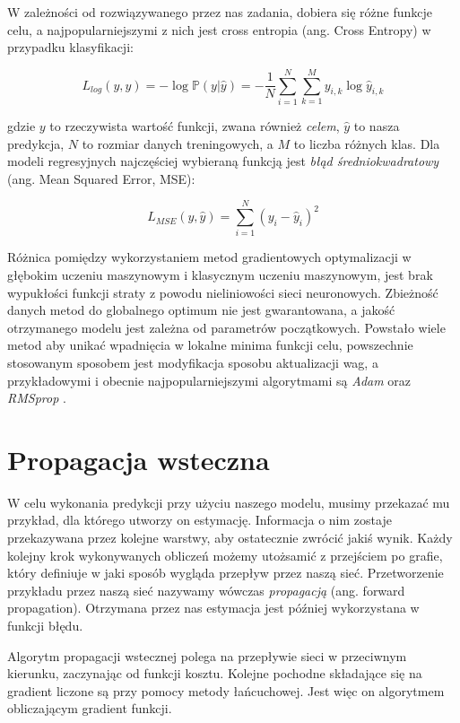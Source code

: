\documentclass[licencjacka]{pracamgr}
\begin{document}
W zależności od rozwiązywanego przez nas zadania, dobiera się różne funkcje celu, a najpopularniejszymi z nich jest cross entropia (ang. Cross Entropy) w przypadku klasyfikacji:

$$ L_{log}(y, \hat{y}) = -\log\mathbb{P}(y | \hat{y}) = 
-\frac{1}{N} \sum_{i = 1}^N \sum_{k = 1}^M y_{i, k} \log \hat{y}_{i, k}
$$

gdzie $y$ to rzeczywista wartość funkcji, zwana również \emph{celem}, $\hat{y}$ to nasza predykcja, $N$ to rozmiar danych treningowych, a $M$ to liczba różnych klas. Dla modeli regresyjnych najczęściej wybieraną funkcją jest \emph{błąd średniokwadratowy} (ang. Mean Squared Error, MSE):

$$ L_{MSE}(y, \hat{y}) = \sum_{i = 1}^N (y_i - \hat{y}_i)^2$$

Różnica pomiędzy wykorzystaniem metod gradientowych optymalizacji w głębokim uczeniu maszynowym i klasycznym uczeniu maszynowym, jest brak wypukłości funkcji straty z powodu nieliniowości sieci neuronowych. Zbieżność danych metod do globalnego optimum nie jest gwarantowana, a jakość otrzymanego modelu jest zależna od parametrów początkowych. Powstało wiele metod aby unikać wpadnięcia w lokalne minima funkcji celu, powszechnie stosowanym sposobem jest modyfikacja sposobu aktualizacji wag, a przykładowymi i obecnie najpopularniejszymi algorytmami są \emph{Adam} \cite{adam} oraz \emph{RMSprop} \cite{rmsprop}. 

\section{Propagacja wsteczna}

W celu wykonania predykcji przy użyciu naszego modelu, musimy przekazać mu przykład, dla którego utworzy on estymację. Informacja o nim zostaje przekazywana przez kolejne warstwy, aby ostatecznie zwrócić jakiś wynik. Każdy kolejny krok wykonywanych obliczeń możemy utożsamić z przejściem po grafie, który definiuje w jaki sposób wygląda przepływ przez naszą sieć. Przetworzenie przykładu przez naszą sieć nazywamy wówczas \emph{propagacją} (ang. forward propagation). Otrzymana przez nas estymacja jest później wykorzystana w funkcji błędu. 

Algorytm propagacji wstecznej \cite{backprop} polega na przepływie sieci w przeciwnym kierunku, zaczynając od funkcji kosztu. Kolejne pochodne składające się na gradient liczone są przy pomocy metody łańcuchowej. Jest więc on algorytmem obliczającym gradient funkcji.
\end{document}
